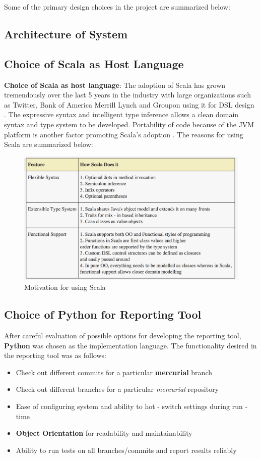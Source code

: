 \documentclass[12pt]{article}
\begin{document}
Some of the primary design choices in the project are summarized below:

\subsection{Architecture of System}

\subsection{Choice of Scala as Host Language}
\textbf{Choice of Scala as host language}: The adoption of Scala has grown tremendously over the last 5 years in the industry with large organizations such as Twitter, Bank of America Merrill Lynch and Groupon using it for DSL design \cite{scala}. The expressive syntax and intelligent type inference allows a clean domain syntax and type system to be developed. Portability of code because of the JVM platform is another factor promoting Scala's adoption \cite{scala}. The reasons for using Scala are summarized below:

\begin{figure}[H]
  \centering
    \includegraphics[width=500px]{figures/scala_motivation.png}
  \caption{Motivation for using Scala}
\end{figure}

\subsection{Choice of Python for Reporting Tool}

After careful evaluation of possible options for developing the reporting tool, \textbf{Python} was chosen as the implementation language. The functionality desired in the reporting tool was as follows:
\begin{itemize}
\item Check out different commits for a particular \textbf{mercurial} branch
\item Check out different branches for a particular \textit{mercurial} repository
\item Ease of configuring system and ability to hot - switch settings during run - time
\item \textbf{Object Orientation} for readability and maintainability
\item Ability to run tests on all branches/commits and report results reliably
\end{itemize}
\end{document}
